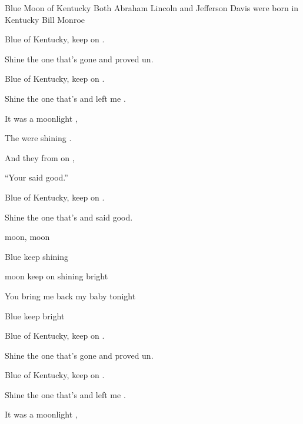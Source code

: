 \begin{SBSong}{Blue Moon of Kentucky}
  {Both Abraham Lincoln and Jefferson Davis were born in Kentucky}
  {Bill Monroe}
  \begin{SBVerse}
    Blue  of Kentucky, keep on . 
    
    Shine  the one that's gone and proved un. 
    
    Blue  of Kentucky, keep on . 
    
    Shine  the one that's  and left me . 
  \end{SBVerse}
  \begin{SBChorus}
    It was  a moonlight , 
    
    The  were shining . 
    
    And they  from on , 
    
    ``Your   said good.'' 
    
    Blue  of Kentucky, keep on . 
    
    Shine  the one that's  and said good.
  \end{SBChorus}
  \begin{SBVerse}
     moon,  moon

    Blue  keep shining 

     moon keep on shining bright
    
    You  bring me back my baby tonight
    
    Blue  keep  bright
  \end{SBVerse}
  \begin{SBVerse}
    Blue  of Kentucky, keep on . 
    
    Shine  the one that's gone and proved un. 
    
    Blue  of Kentucky, keep on . 
    
    Shine  the one that's  and left me . 
  \end{SBVerse}
  \begin{SBChorus}
    It was  a moonlight , 
    

\end{SBChorus}
\end{SBSong}
